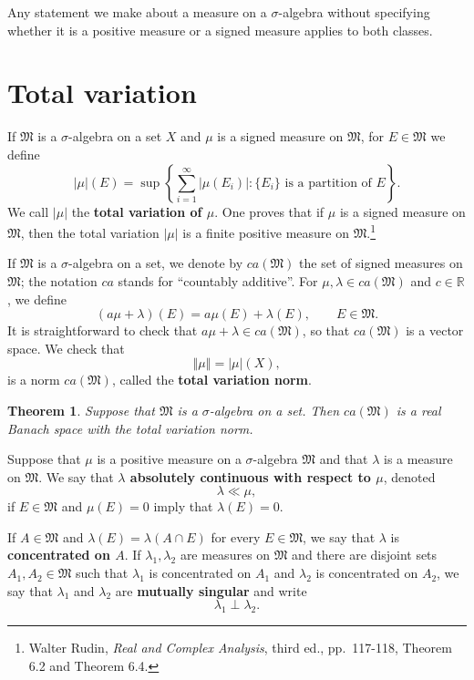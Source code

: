 \documentclass{article}
\newcommand{\norm}[1]{\left\Vert #1 \right\Vert}
\newtheorem{theorem}{Theorem}
\theoremstyle{definition}
\begin{document}
Any statement we make about a measure on a $\sigma$-algebra without specifying whether it is a positive measure or a signed
measure applies to both classes.


\section{Total variation}
If $\mathfrak{M}$ is a $\sigma$-algebra on a set $X$ and $\mu$ is a signed measure on $\mathfrak{M}$, for $E \in \mathfrak{M}$ we define
\[
|\mu|(E) = \sup\left\{ \sum_{i=1}^\infty |\mu(E_i)|: \textrm{$\{E_i\}$ is a partition of $E$}\right\}.
\]
We call $|\mu|$ the \textbf{total variation of $\mu$}. One proves that if $\mu$ is a signed measure
on $\mathfrak{M}$, then the total variation $|\mu|$ is a finite positive measure on $\mathfrak{M}$.\footnote{Walter
Rudin, {\em Real and Complex Analysis}, third ed., pp.~117-118, Theorem 6.2 and Theorem 6.4.} 


If $\mathfrak{M}$ is a $\sigma$-algebra on a set, 
we denote by $ca(\mathfrak{M})$ the set of  signed  measures on $\mathfrak{M}$; the notation $ca$ stands for ``countably additive''.
For $\mu,\lambda \in ca(\mathfrak{M})$ and $c \in \mathbb{R}$,  we define
\[
(a\mu + \lambda)(E) = a\mu(E)+\lambda(E), \qquad E \in \mathfrak{M}.
\]
It is straightforward to check that $a\mu+\lambda \in ca(\mathfrak{M})$, so that $ca(\mathfrak{M})$ is a vector space. We check that
\[
\norm{\mu}=|\mu|(X),
\]
is a norm $ca(\mathfrak{M})$, called the  \textbf{total variation norm}.

\begin{theorem}
Suppose that $\mathfrak{M}$ is a $\sigma$-algebra on a set.  Then $ca(\mathfrak{M})$ is a real Banach space with the total variation norm.
\end{theorem}


Suppose that $\mu$ is a positive measure on a $\sigma$-algebra $\mathfrak{M}$ and that $\lambda$ is a measure
on $\mathfrak{M}$. We say that \textbf{$\lambda$ absolutely continuous with respect to $\mu$}, denoted
\[
\lambda \ll \mu,
\]
if $E \in \mathfrak{M}$ and $\mu(E)=0$ imply that $\lambda(E)=0$. 

If $A \in \mathfrak{M}$ and $\lambda(E) = \lambda(A \cap E)$ for every $E \in \mathfrak{M}$, we say that $\lambda$ is \textbf{concentrated
on $A$}. If $\lambda_1,\lambda_2$ are measures on $\mathfrak{M}$ and there are disjoint sets
$A_1,A_2 \in \mathfrak{M}$ such that $\lambda_1$ is concentrated on $A_1$ and $\lambda_2$ is concentrated on $A_2$, we say that
$\lambda_1$ and $\lambda_2$ are \textbf{mutually singular} and write
\[
\lambda_1 \perp \lambda_2.
\]
\end{document}
